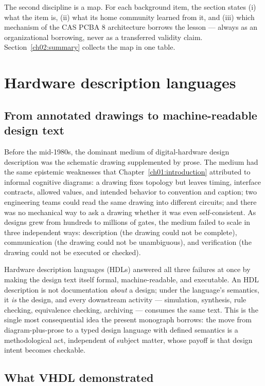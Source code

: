 The second discipline is a map. For each background item, the section
states (i) what the item is, (ii) what its home community learned from it,
and (iii) which mechanism of the CAS PCBA 8 architecture borrows the lesson
--- always as an organizational borrowing, never as a transferred validity
claim. Section~\ref{ch02:summary} collects the map in one table.

\section{Hardware description languages}\label{ch02:hdl}

\subsection{From annotated drawings to machine-readable design text}\label{ch02:hdl:drawings}

Before the mid-1980s, the dominant medium of digital-hardware design
description was the schematic drawing supplemented by prose. The medium had
the same epistemic weaknesses that Chapter~\ref{ch01:introduction} attributed
to informal cognitive diagrams: a drawing fixes topology but leaves timing,
interface contracts, allowed values, and intended behavior to convention and
caption; two engineering teams could read the same drawing into different
circuits; and there was no mechanical way to ask a drawing whether it was
even self-consistent. As designs grew from hundreds to millions of gates,
the medium failed to scale in three independent ways: description (the
drawing could not be complete), communication (the drawing could not be
unambiguous), and verification (the drawing could not be executed or
checked).

Hardware description languages (HDLs) answered all three failures at once by
making the design text itself formal, machine-readable, and executable. An
HDL description is not documentation \emph{about} a design; under the
language's semantics, it \emph{is} the design, and every downstream activity
--- simulation, synthesis, rule checking, equivalence checking, archiving
--- consumes the same text. This is the single most consequential idea the
present monograph borrows: the move from diagram-plus-prose to a typed
design language with defined semantics is a methodological act, independent
of subject matter, whose payoff is that design intent becomes checkable.

\subsection{What VHDL demonstrated}\label{ch02:hdl:vhdl}

